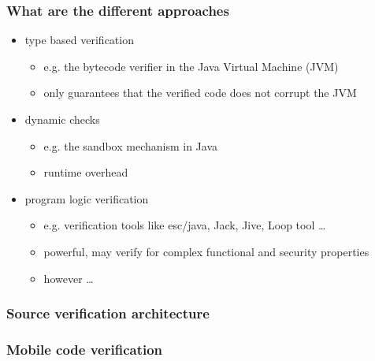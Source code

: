 \documentclass{beamer}
\begin{document}
\begin{frame}
 \frametitle{What are the different approaches}
 \begin{itemize}
   \item type based verification  
        \begin{itemize}
               \item e.g. the bytecode verifier in the Java Virtual Machine (JVM) 
               \item only guarantees that the verified code does not corrupt  the JVM 
         \end{itemize}
   \item dynamic checks 
        \begin{itemize} 
                \item e.g. the sandbox mechanism in Java  %
		\item runtime overhead  
        \end{itemize}
    \item program logic  verification 
         \begin{itemize} 
                \item e.g. verification tools like esc/java, Jack, Jive, Loop tool \ldots
                \item powerful, may verify for complex functional and security properties
	        \item however \ldots 
	 \end{itemize}
 \end{itemize}
\end{frame}

\begin{frame}[shrink]
\frametitle{Source verification architecture}
\begin{figure} 
\begin{center}
\end{center}
\end{figure}
\end{frame}





\begin{frame}[shrink]
\frametitle{Mobile code verification}
\begin{figure}[hc]
\begin{center}
\end{center}
\end{figure}
\end{frame}
\end{document}
